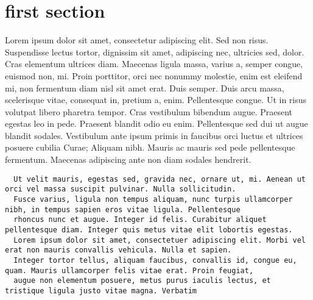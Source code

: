 \documentclass[12pt]{article}
\begin{document}
\section*{first section}

Lorem ipsum dolor sit amet, consectetur adipiscing elit. Sed non risus. Suspendisse lectus tortor, dignissim sit amet,
adipiscing nec, ultricies sed, dolor. Cras elementum ultrices diam. Maecenas ligula massa, varius a, semper congue, euismod non,
mi. Proin porttitor, orci nec nonummy molestie, enim est eleifend mi, non fermentum diam nisl sit amet erat. Duis semper. Duis
arcu massa, scelerisque vitae, consequat in, pretium a, enim. Pellentesque congue. Ut in risus volutpat libero pharetra tempor.
Cras vestibulum bibendum augue. Praesent egestas leo in pede. Praesent blandit odio eu enim. Pellentesque sed dui ut augue
blandit sodales. Vestibulum ante ipsum primis in faucibus orci luctus et ultrices posuere cubilia Curae; Aliquam nibh. Mauris ac
mauris sed pede pellentesque fermentum. Maecenas adipiscing ante non diam sodales hendrerit. 

\begin{verbatim}
  Ut velit mauris, egestas sed, gravida nec, ornare ut, mi. Aenean ut orci vel massa suscipit pulvinar. Nulla sollicitudin.
  Fusce varius, ligula non tempus aliquam, nunc turpis ullamcorper nibh, in tempus sapien eros vitae ligula. Pellentesque
  rhoncus nunc et augue. Integer id felis. Curabitur aliquet pellentesque diam. Integer quis metus vitae elit lobortis egestas.
  Lorem ipsum dolor sit amet, consectetuer adipiscing elit. Morbi vel erat non mauris convallis vehicula. Nulla et sapien.
  Integer tortor tellus, aliquam faucibus, convallis id, congue eu, quam. Mauris ullamcorper felis vitae erat. Proin feugiat,
  augue non elementum posuere, metus purus iaculis lectus, et tristique ligula justo vitae magna. Verbatim
\end{verbatim}
\end{document}
